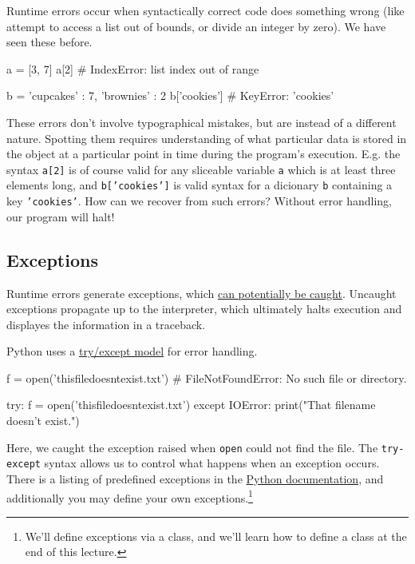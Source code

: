 \documentclass[12pt,letterpaper,twoside]{article}
\begin{document}
Runtime errors occur when syntactically correct code does something
wrong (like attempt to access a list out of bounds, or divide an integer by zero).
We have seen these before.

\begin{python}
a = [3, 7]
a[2]          # IndexError: list index out of range

b = {'cupcakes' : 7, 'brownies' : 2}
b['cookies']  # KeyError: 'cookies'
\end{python}

These errors don't involve typographical mistakes, but are instead of a different nature.
Spotting them requires understanding of what particular data is stored in the object
at a particular point in time during the program's execution. E.g. 
the syntax \texttt{a[2]} is of course valid for any sliceable variable \texttt{a} which is at least three elements long,
and \texttt{b['cookies']} is valid syntax for a dicionary \texttt{b} containing a key \texttt{'cookies'}.
How can we recover from such errors? Without error handling, our program will halt!

\subsection{Exceptions}
Runtime errors generate exceptions, which \href{https://en.wikipedia.org/wiki/Exception_handling}{can potentially be caught}. 
Uncaught exceptions propagate up to the interpreter, which
ultimately halts execution and displayes the information in a traceback.

Python uses a \href{https://docs.python.org/3/tutorial/errors.html#handling-exceptions}{try/except model} 
for error handling.

\begin{python}
f = open('thisfiledoesntexist.txt')   # FileNotFoundError: No such file or directory.
\end{python}

\begin{python}
try:
    f = open('thisfiledoesntexist.txt')
except IOError:
    print("That filename doesn't exist.")
\end{python}

Here, we caught the exception raised when \texttt{open} could not find
the file. The \texttt{try-except} syntax allows us to control what
happens when an exception occurs. There is a listing of predefined
exceptions in the \href{https://docs.python.org/3/library/exceptions.html#Exception}{Python documentation}, 
and additionally you may define your own
exceptions.\footnote{We'll define exceptions via a class, and we'll learn how to define a class at the end of this lecture.}
\end{document}
